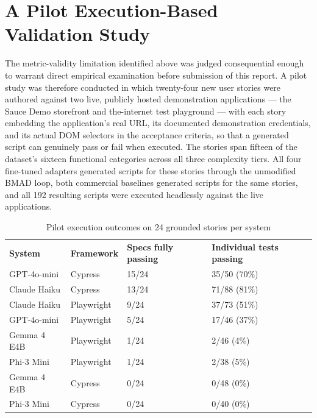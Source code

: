 \section{A Pilot Execution-Based Validation Study}

The metric-validity limitation identified above was judged consequential
enough to warrant direct empirical examination before submission of this
report. A pilot study was therefore conducted in which twenty-four new
user stories were authored against two live, publicly hosted
demonstration applications --- the Sauce Demo storefront and
the-internet test playground --- with each story embedding the
application's real URL, its documented demonstration credentials, and
its actual DOM selectors in the acceptance criteria, so that a generated
script can genuinely pass or fail when executed. The stories span
fifteen of the dataset's sixteen functional categories across all three
complexity tiers. All four fine-tuned adapters generated scripts for
these stories through the unmodified BMAD loop, both commercial
baselines generated scripts for the same stories, and all 192 resulting
scripts were executed headlessly against the live applications.

\begin{longtable}[]{@{}llll@{}}
\caption{Pilot execution outcomes on 24 grounded stories per
system}\tabularnewline
\toprule
\endhead
\textbf{System} & \textbf{Framework} & \textbf{Specs fully passing} &
\textbf{Individual tests passing} \\
GPT-4o-mini & Cypress & 15/24 & 35/50 (70\%) \\
Claude Haiku & Cypress & 13/24 & 71/88 (81\%) \\
Claude Haiku & Playwright & 9/24 & 37/73 (51\%) \\
GPT-4o-mini & Playwright & 5/24 & 17/46 (37\%) \\
Gemma 4 E4B & Playwright & 1/24 & 2/46 (4\%) \\
Phi-3 Mini & Playwright & 1/24 & 2/38 (5\%) \\
Gemma 4 E4B & Cypress & 0/24 & 0/48 (0\%) \\
Phi-3 Mini & Cypress & 0/24 & 0/40 (0\%) \\
\bottomrule
\end{longtable}

